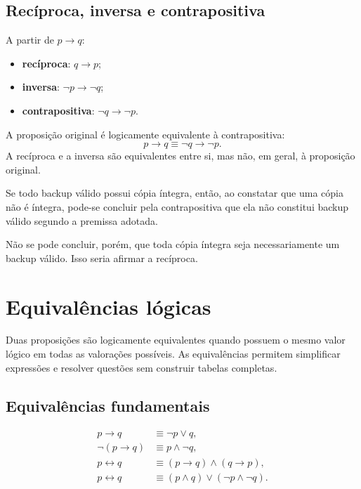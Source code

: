 \subsection{Recíproca, inversa e contrapositiva}

A partir de $p\to q$:
\begin{itemize}
\item \textbf{recíproca}: $q\to p$;
\item \textbf{inversa}: $\neg p\to\neg q$;
\item \textbf{contrapositiva}: $\neg q\to\neg p$.
\end{itemize}

A proposição original é logicamente equivalente à contrapositiva:
\[
p\to q\equiv\neg q\to\neg p.
\]
A recíproca e a inversa são equivalentes entre si, mas não, em geral, à proposição original.

\begin{exemplo}[contrapositiva]
Se todo backup válido possui cópia íntegra, então, ao constatar que uma cópia não é íntegra, pode-se concluir pela contrapositiva que ela não constitui backup válido segundo a premissa adotada.

Não se pode concluir, porém, que toda cópia íntegra seja necessariamente um backup válido. Isso seria afirmar a recíproca.
\end{exemplo}

\section{Equivalências lógicas}

Duas proposições são logicamente equivalentes quando possuem o mesmo valor lógico em todas as valorações possíveis. As equivalências permitem simplificar expressões e resolver questões sem construir tabelas completas.

\subsection{Equivalências fundamentais}

\begin{align*}
p\to q &\equiv \neg p\lor q,\\
\neg(p\to q) &\equiv p\land\neg q,\\
p\leftrightarrow q &\equiv (p\to q)\land(q\to p),\\
p\leftrightarrow q &\equiv (p\land q)\lor(\neg p\land\neg q).
\end{align*}

